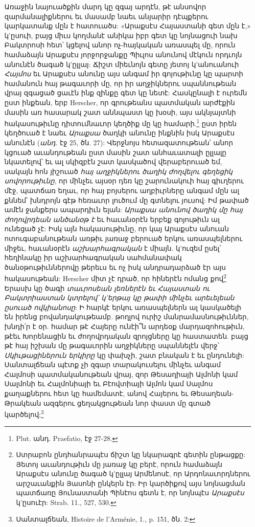 \documentclass{article}
\begin{document}
{Առաջին նայուածքին մարդ կը զգայ արդէն, թէ անսովոր զարմանալիքներու եւ մասամբ նաեւ անյարիր դէպքերու կարկատանք մըն է հատուածս: «Արաքսէս Հայաստանի գետ մըն է,» կ'ըսուի, բայց միւս կողմանէ անիկա իբր գետ կը նոյնացուի նախ Բակտրոսի հետ՝ կցելով անոր ոչ-հայկական առասպել մը, որուն համաձայն Արաքսէս յորջորջանքը Պիւլոս անունով մէկուն որդւոյն անունէն ծագած կ'ըլլայ: Ճիշտ միեւնոյն գետը յետոյ կ'անուանուի \emph{Հայմոս} եւ Արաքսէս անունը այս անգամ իր գոյութիւնը կը պարտի համանուն հայ թագաւորի մը, որ իր աղջիկներու սպաննութեան վրայ զգացած ցաւէն ինք զինքը գետ կը նետէ: Հասկընալի է ուրեմն ըստ ինքեան, երբ Herscher, որ գրութեանս պատմական արժէքին մասին առ հասարակ շատ աննպաստ կը խօսի, այս ակնյայտնի հակասութիւնը դիտումնաւոր կեղծիք մը կը համարի.\footnote{Plut. անդ. Praefatio, էջ 27-28.} ըստ իրեն կեղծուած է նաեւ \emph{Արաքսա} ծաղկի անունը ինքնին իսկ Արաքսէս անունէն (\emph{անդ.} էջ 25, ծն. 27): Վերջնոյս հետազատութեան՝ անոր կցուած աւանդութեան ըստ մասին շատ անհաւատալի ըլլալը նկատելով՝ եւ ալ սկիզբէն շատ կասկածով վերաբերուած եմ, սակայն հոն յիշուած \emph{հայ աղջիկներու ծաղիկ ժողվելու գեղեցիկ սովորութիւնը}, որ մինչեւ այսօր դեռ կը շարունակուի հայ գիւղերու մէջ, պատճառ եղաւ, որ հայ բոյսերու աղբիւրները անգամ մըն ալ քննեմ՝ խնդրոյն գէթ հեռաւոր լուծում մը գտնելու յուսով: Իմ թափած ամէն ջանքերս ապարդիւն ելան: \emph{Արաքսա անունով ծաղիկ մը հայ ժողովրդեան անծանօթ է} եւ հաւանօրէն երբեք գոյութիւն ալ ունեցած չէ: Իսկ այն հակասութիւնը, որ կայ Արաքսէս անուան ոտուգաբանութեան առթիւ յառաջ բերուած երկու առասպելներու միջեւ, հաւանօրէն \emph{աշխարհագրական} է միայն. կ'ուզեմ ըսել՝ հեղինակը իր աշխարհագրական սահմանափակ ծանօթութիւններովը թերեւս եւ ոչ իսկ անդրադարձած էր այս հակասութեան: Herscher միտ չէ դրած, որ հիներէն ոմանց քով\footnote{Ստրաբոն ընդհանրապէս ճիշտ կը նկարագրէ գետին ընթացքը: Յետոյ աւանդութիւն մը յառաջ կը բերէ, որուն համաձայն Արաքսէս անունը ծագած կ'ըլլայ Արմենոսէ, որ Արդոնաւորդներու արշաւանքին Յասոնի ընկերն էր: Իր կարծիքով այս նոյնացման պատճառը Յունաստանի Պինէոս գետն է, որ նոյնպէս \emph{Արաքսէս} կ'ըսուէր: Strab. 11., 527, 530.} Երասխ կը ծագի \emph{տաւրոսեան լեռներէն եւ Հայաստան ու Բակտրիաստան կտրելով՝ կ'երթայ կը թափի մինչեւ արեւելեան ըսուած ովկիանոսը}: Ի հարկէ երկու առասպելներն ալ կասկածելի են իրենց բովանդակութեամբ. թողլով ուրիշ մանրամասնութիւններ, խնդի՛ր է օր. համար թէ Հայերը ունէի՞ն արդեօք մարդազոհութիւն, թէեւ Խորենացին եւ ժողովրդական զրոյցները կը հաստատեն. բայց թէ հայ իշխան մը թագաւորին աղջիկները սպաննելէն վերջ՝ \emph{Սկիւթացիներուն երկիրը} կը փախչի, շատ բնական է եւ ընդունելի: Սանտալճեան պէտք չի զգար տարակուսելու մինչեւ անգամ Հալմոսի պատմականութեան վրայ, զոր Թեսաղիայի Ալմոնի կամ Սալմոնի եւ Հալմոնիայի եւ Բէովտիայի Ալմոն կամ Սալմոս քաղաքներու հետ կը համեմատէ, անով Հայերու եւ Թեսաղեան-Թրակեան ազգերու ցեղակցութեան նոր փաստ մը գտած կարծելով:\footnote{Սանտալճեան, Histoire de l'Arménie, 1., p. 151, ծն. 2:}

}
\end{document}
